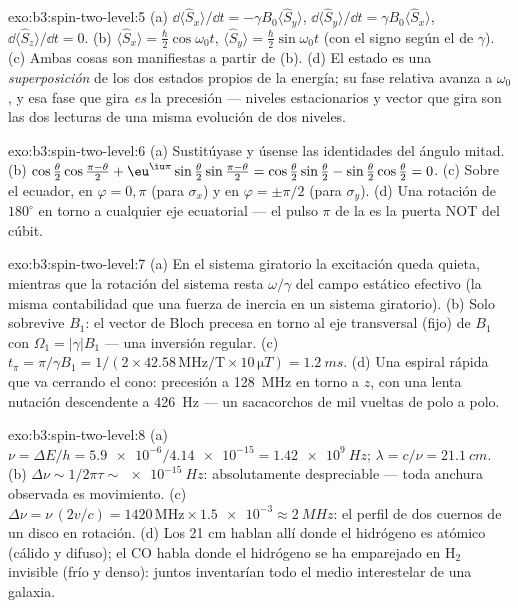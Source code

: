 \begin{solution}{exo:b3:spin-two-level:5}
(a) $\dd\langle\hat S_x\rangle/\dd t = -\gamma B_0\langle\hat
S_y\rangle$, $\dd\langle\hat S_y\rangle/\dd t = \gamma
B_0\langle\hat S_x\rangle$, $\dd\langle\hat S_z\rangle/\dd t = 0$.
(b) $\langle\hat S_x\rangle = \tfrac\hbar2\cos\omega_0t$,
$\langle\hat S_y\rangle = \tfrac\hbar2\sin\omega_0t$ (con el signo según
el de $\gamma$). (c) Ambas cosas son manifiestas a partir de (b). (d) El
estado es una \emph{superposición} de los dos estados propios de la
energía; su fase relativa avanza a $\omega_0$, y esa fase que gira
\emph{es} la precesión --- niveles estacionarios y vector que gira son las
dos lecturas de una misma evolución de dos niveles.
\end{solution}

\begin{solution}{exo:b3:spin-two-level:6}
(a) Sustitúyase y úsense las identidades del ángulo mitad. (b)
$\cos\tfrac\theta2\cos\tfrac{\pi-\theta}2 +
\eu^{\iu\pi}\sin\tfrac\theta2\sin\tfrac{\pi-\theta}2 =
\cos\tfrac\theta2\sin\tfrac\theta2 -
\sin\tfrac\theta2\cos\tfrac\theta2 = 0$. (c) Sobre el ecuador, en
$\varphi = 0, \pi$ (para $\sigma_x$) y en $\varphi = \pm\pi/2$
(para $\sigma_y$). (d) Una rotación de $180^\circ$ en torno a cualquier eje
ecuatorial --- el pulso $\pi$ de la  es la puerta NOT
del cúbit.
\end{solution}

\begin{solution}{exo:b3:spin-two-level:7}
(a) En el sistema giratorio la excitación queda quieta, mientras que la
rotación del sistema resta $\omega/\gamma$ del campo estático efectivo
(la misma contabilidad que una fuerza de inercia en un sistema giratorio).
(b) Solo sobrevive $B_1$: el vector de Bloch precesa en torno al eje
transversal (fijo) de $B_1$ con $\Omega_1 = |\gamma|B_1$ --- una
inversión regular. (c) $t_\pi = \pi/\gamma B_1 = 1/(2 \times 42.58\,\text{
MHz/T} \times 10\,\unit{\micro T}) = \qty{1.2}{ms}$. (d) Una espiral
rápida que va cerrando el cono: precesión a \qty{128}{MHz} en torno a $z$,
con una lenta nutación descendente a \qty{426}{Hz} --- un sacacorchos de
mil vueltas de polo a polo.
\end{solution}

\begin{solution}{exo:b3:spin-two-level:8}
(a) $\nu = \Delta E/h = \num{5.9e-6}/\num{4.14e-15} =
\qty{1.42e9}{Hz}$; $\lambda = c/\nu = \qty{21.1}{cm}$. (b) $\Delta
\nu \sim 1/2\pi\tau \sim \qty{e-15}{Hz}$: absolutamente despreciable ---
toda anchura observada es movimiento. (c) $\Delta\nu =
\nu\,(2v/c) = 1420\,\text{MHz} \times \num{1.5e-3} \approx
\qty{2}{MHz}$: el perfil de dos cuernos de un disco en rotación. (d)
Los 21 cm hablan allí donde el hidrógeno es atómico (cálido y difuso); el CO
habla donde el hidrógeno se ha emparejado en H$_2$ invisible (frío y
denso): juntos inventarían todo el medio interestelar de una galaxia.
\end{solution}

